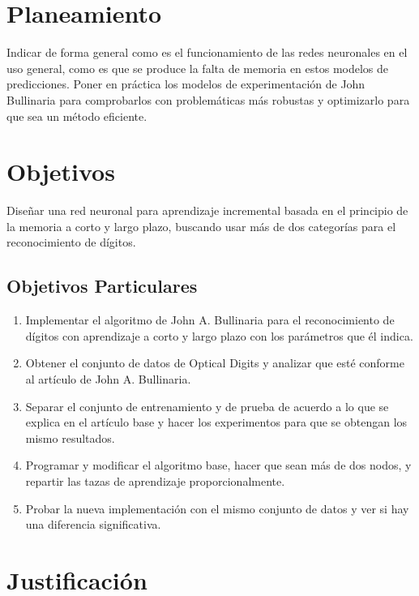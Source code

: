 \section{Planeamiento}

    Indicar de forma general como es el funcionamiento de las redes neuronales en el uso general, como es que se produce la falta de memoria en 
    estos modelos de predicciones. Poner en pr\'actica los modelos de experimentación de John Bullinaria para comprobarlos con
    problemáticas m\'as robustas y optimizarlo para que sea un m\'etodo eficiente.
    
\section{Objetivos}
    Diseñar una red neuronal para aprendizaje incremental basada en el principio de la memoria a corto y largo plazo, buscando usar más de dos categorías para el reconocimiento de dígitos.
    \subsection{Objetivos Particulares}
        \begin{enumerate}
            \item Implementar el algoritmo de John A. Bullinaria para el reconocimiento de dígitos con aprendizaje a corto y largo plazo con los parámetros que él indica.
            \item Obtener el conjunto de datos de Optical Digits y analizar que esté conforme al artículo de John A. Bullinaria.
            \item Separar el conjunto de entrenamiento y de prueba de acuerdo a lo que se explica en el artículo base y hacer los experimentos para que se obtengan los mismo resultados.
            \item Programar y modificar el algoritmo base, hacer que sean más de dos nodos, y repartir las tazas de aprendizaje proporcionalmente.
            \item Probar la nueva implementación con el mismo conjunto de datos y ver si hay una diferencia significativa.
        \end{enumerate}
\section{Justificaci\'on}

